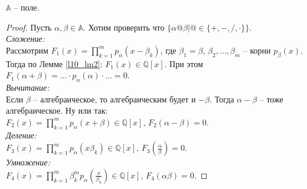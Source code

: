 \begin{theorem} \label{l10_th1}
	$\mathbb{A}$ -- поле.
\end{theorem}
\begin{proof}
	Пусть $\alpha, \beta \in \mathbb{A}$. Хотим проверить что $\{ \alpha @ \beta \vert @ \in \{+, -, /, \cdot \} \}$.\\
	\textit{Сложение:}\\
	Рассмотрим $\displaystyle F_1(x) = \prod\limits_{k=1}^m p_\alpha\left( x-\beta_k \right)$, где $\beta_1 = \beta, \, \beta_2,\dots,\beta_m$ -- корни $p_\beta(x)$. Тогда по Лемме \ref{l10_lm2}: $F_1(x) \in \mathbb{Q}[x]$. При этом $\displaystyle F_1(\alpha + \beta) = \dots \cdot p_\alpha(\alpha) \cdot \dots = 0$.\\
	\textit{Вычитание:}\\
Если $\beta$ -- алгебраическое, то алгебраическим будет и $-\beta$. Тогда $\alpha-\beta$ -- тоже алгебраическое. Ну или так: $\displaystyle F_2(x) = \prod\limits_{k=1}^m p_\alpha \left( x+\beta \right) \in \mathbb{Q}[x], \, F_2(\alpha-\beta)=0$.\\
	\textit{Деление:}\\
	$\displaystyle F_3(x) = \prod\limits_{k=1}^m p_\alpha\left( x\beta_k \right) \in \mathbb{Q}[x], \, F_3\left( \frac{\alpha}{\beta} \right) = 0$.\\
	\textit{Умножение:}\\
	$\displaystyle F_4(x) = \prod\limits_{k=1}^m \beta_k^m p_\alpha\left( \frac{x}{\beta_k} \right) \in \mathbb{Q}[x], \, F_4\left( \alpha\beta \right) = 0$.
\end{proof}